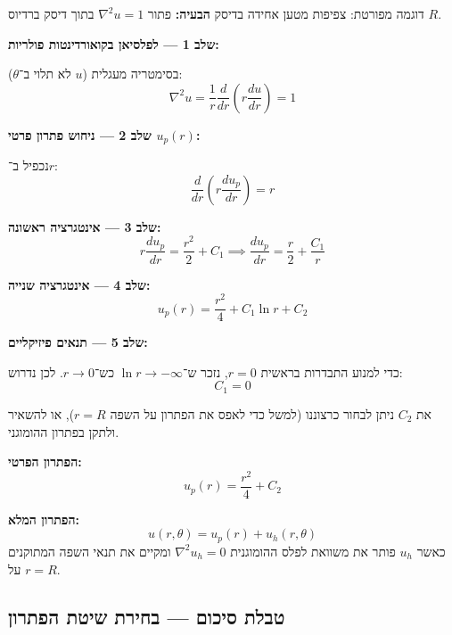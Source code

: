 \begin{examplebox}{דוגמה מפורטת: צפיפות מטען אחידה בדיסק}
\textbf{הבעיה:} פתור $\nabla^2 u = 1$ בתוך דיסק ברדיוס $R$.

\textbf{שלב 1 — לפלסיאן בקואורדינטות פולריות:}

בסימטריה מעגלית ($u$ לא תלוי ב־$\theta$):
\begin{equation}
\nabla^2 u = \frac{1}{r}\frac{d}{dr}\left(r\frac{du}{dr}\right) = 1
\end{equation}

\textbf{שלב 2 — ניחוש פתרון פרטי $u_p(r)$:}

נכפיל ב־$r$:
\[
\frac{d}{dr}\left(r\frac{du_p}{dr}\right) = r
\]

\textbf{שלב 3 — אינטגרציה ראשונה:}
\[
r\frac{du_p}{dr} = \frac{r^2}{2} + C_1 \implies \frac{du_p}{dr} = \frac{r}{2} + \frac{C_1}{r}
\]

\textbf{שלב 4 — אינטגרציה שנייה:}
\begin{equation}
u_p(r) = \frac{r^2}{4} + C_1 \ln r + C_2
\end{equation}

\textbf{שלב 5 — תנאים פיזיקליים:}

כדי למנוע התבדרות בראשית $r = 0$, נזכר ש־$\ln r \to -\infty$ כש־$r \to 0$.
לכן נדרוש:
\[
\boxed{C_1 = 0}
\]

את $C_2$ ניתן לבחור כרצוננו (למשל כדי לאפס את הפתרון על השפה $r=R$), או להשאיר ולתקן בפתרון ההומוגני.

\textbf{הפתרון הפרטי:}
\[
\boxed{u_p(r) = \frac{r^2}{4} + C_2}
\]

\textbf{הפתרון המלא:}
\[
u(r,\theta) = u_p(r) + u_h(r,\theta)
\]
כאשר $u_h$ פותר את משוואת לפלס ההומוגנית $\nabla^2 u_h = 0$ ומקיים את תנאי השפה המתוקנים על $r = R$.
\end{examplebox}

\subsection{טבלת סיכום  — בחירת שיטת הפתרון}

